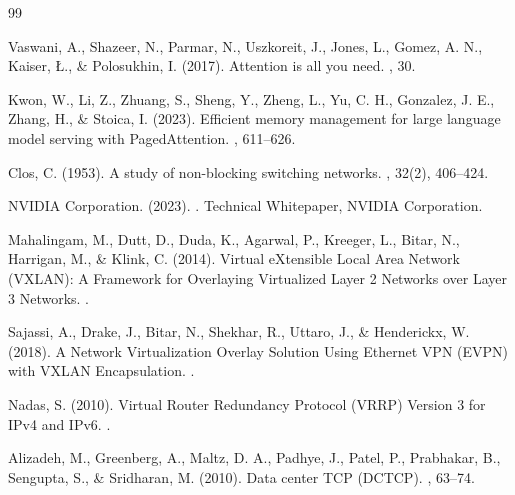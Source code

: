 \documentclass[12pt,a4paper]{report}
\begin{document}
\begin{thebibliography}{99}

Vaswani, A., Shazeer, N., Parmar, N., Uszkoreit, J., Jones, L., Gomez, A. N., Kaiser, \L., \& Polosukhin, I. (2017).
\newblock Attention is all you need.
, 30.

Kwon, W., Li, Z., Zhuang, S., Sheng, Y., Zheng, L., Yu, C. H., Gonzalez, J. E., Zhang, H., \& Stoica, I. (2023).
\newblock Efficient memory management for large language model serving with PagedAttention.
, 611--626.

Clos, C. (1953).
\newblock A study of non-blocking switching networks.
, 32(2), 406--424.

NVIDIA Corporation. (2023).
.
\newblock Technical Whitepaper, NVIDIA Corporation.

Mahalingam, M., Dutt, D., Duda, K., Agarwal, P., Kreeger, L., Bitar, N., Harrigan, M., \& Klink, C. (2014).
\newblock Virtual eXtensible Local Area Network (VXLAN): A Framework for Overlaying Virtualized Layer 2 Networks over Layer 3 Networks.
.

Sajassi, A., Drake, J., Bitar, N., Shekhar, R., Uttaro, J., \& Henderickx, W. (2018).
\newblock A Network Virtualization Overlay Solution Using Ethernet VPN (EVPN) with VXLAN Encapsulation.
.

Nadas, S. (2010).
\newblock Virtual Router Redundancy Protocol (VRRP) Version 3 for IPv4 and IPv6.
.

Alizadeh, M., Greenberg, A., Maltz, D. A., Padhye, J., Patel, P., Prabhakar, B., Sengupta, S., \& Sridharan, M. (2010).
\newblock Data center TCP (DCTCP).
, 63--74.

\end{thebibliography}
\end{document}
